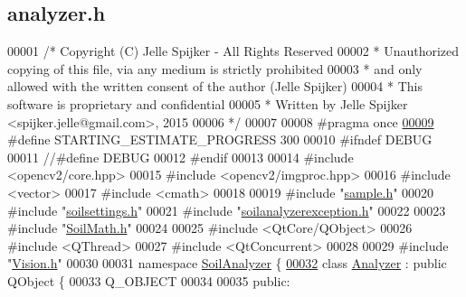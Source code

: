 \hypertarget{analyzer_8h_source}{}\subsection{analyzer.\+h}
\label{analyzer_8h_source}

\begin{DoxyCode}
00001 \textcolor{comment}{/* Copyright (C) Jelle Spijker - All Rights Reserved}
00002 \textcolor{comment}{ * Unauthorized copying of this file, via any medium is strictly prohibited}
00003 \textcolor{comment}{ * and only allowed with the written consent of the author (Jelle Spijker)}
00004 \textcolor{comment}{ * This software is proprietary and confidential}
00005 \textcolor{comment}{ * Written by Jelle Spijker <spijker.jelle@gmail.com>, 2015}
00006 \textcolor{comment}{ */}
00007 
00008 \textcolor{preprocessor}{#pragma once}
\hypertarget{analyzer_8h_source_l00009}{}\hyperlink{analyzer_8h_a7376114637d76e3bb5d1e28c37d7de94}{00009} \textcolor{preprocessor}{#define STARTING\_ESTIMATE\_PROGRESS 300}
00010 \textcolor{preprocessor}{#ifndef DEBUG}
00011 \textcolor{comment}{//#define DEBUG}
00012 \textcolor{preprocessor}{#endif}
00013 
00014 \textcolor{preprocessor}{#include <opencv2/core.hpp>}
00015 \textcolor{preprocessor}{#include <opencv2/imgproc.hpp>}
00016 \textcolor{preprocessor}{#include <vector>}
00017 \textcolor{preprocessor}{#include <cmath>}
00018 
00019 \textcolor{preprocessor}{#include "\hyperlink{sample_8h}{sample.h}"}
00020 \textcolor{preprocessor}{#include "\hyperlink{soilsettings_8h}{soilsettings.h}"}
00021 \textcolor{preprocessor}{#include "\hyperlink{soilanalyzerexception_8h}{soilanalyzerexception.h}"}
00022 
00023 \textcolor{preprocessor}{#include "\hyperlink{_soil_math_8h}{SoilMath.h}"}
00024 
00025 \textcolor{preprocessor}{#include <QtCore/QObject>}
00026 \textcolor{preprocessor}{#include <QThread>}
00027 \textcolor{preprocessor}{#include <QtConcurrent>}
00028 
00029 \textcolor{preprocessor}{#include "\hyperlink{_vision_8h}{Vision.h}"}
00030 
00031 \textcolor{keyword}{namespace }\hyperlink{namespace_soil_analyzer}{SoilAnalyzer} \{
\hypertarget{analyzer_8h_source_l00032}{}\hyperlink{class_soil_analyzer_1_1_analyzer}{00032} \textcolor{keyword}{class }\hyperlink{class_soil_analyzer_1_1_analyzer}{Analyzer} : \textcolor{keyword}{public} QObject \{
00033   Q\_OBJECT
00034 
00035 \textcolor{keyword}{public}:

\end{DoxyCode}
